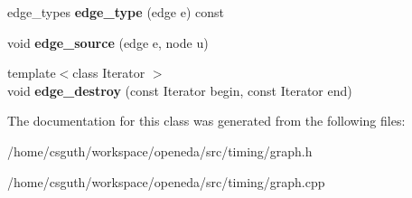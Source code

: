 \begin{DoxyCompactItemize}
\item 
\hypertarget{classophidian_1_1timing_1_1graph_ac3490d78fe7f9b7a0b61369f1e170f18}{edge\-\_\-types {\bfseries edge\-\_\-type} (edge e) const }\label{classophidian_1_1timing_1_1graph_ac3490d78fe7f9b7a0b61369f1e170f18}

\item 
\hypertarget{classophidian_1_1timing_1_1graph_a7104b3510c15b5e61b17e475b85ac108}{void {\bfseries edge\-\_\-source} (edge e, node u)}\label{classophidian_1_1timing_1_1graph_a7104b3510c15b5e61b17e475b85ac108}

\item 
\hypertarget{classophidian_1_1timing_1_1graph_abd911d419f0ad98575fe8a8f731d177e}{{\footnotesize template$<$class Iterator $>$ }\\void {\bfseries edge\-\_\-destroy} (const Iterator begin, const Iterator end)}\label{classophidian_1_1timing_1_1graph_abd911d419f0ad98575fe8a8f731d177e}

\end{DoxyCompactItemize}


The documentation for this class was generated from the following files\-:\begin{DoxyCompactItemize}
\item 
/home/csguth/workspace/openeda/src/timing/graph.\-h\item 
/home/csguth/workspace/openeda/src/timing/graph.\-cpp\end{DoxyCompactItemize}

